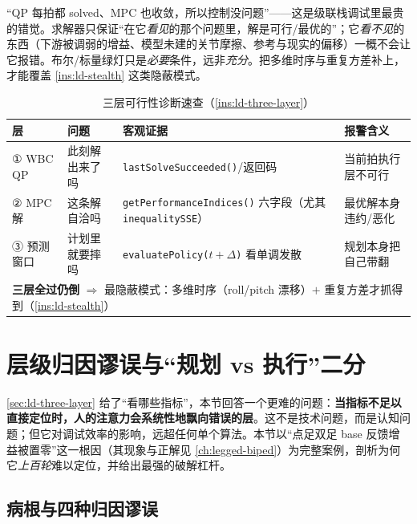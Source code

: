 \begin{pitfall}
“QP 每拍都 solved、MPC 也收敛，所以控制没问题”——这是级联栈调试里最贵的错觉。求解器只保证“在它\emph{看见}的那个问题里，解是可行/最优的”；它\emph{看不见}的东西（下游被调弱的增益、模型未建的关节摩擦、参考与现实的偏移）一概不会让它报错。布尔/标量绿灯只是\emph{必要}条件，远非\emph{充分}。把多维时序与重复方差补上，才能覆盖 \cref{ins:ld-stealth} 这类隐蔽模式。
\end{pitfall}

\begin{table}[H]\centering\small
\caption{三层可行性诊断速查（\cref{ins:ld-three-layer}）}
\begin{tabular}{p{} p{} p{} p{}}
\toprule
层 & 问题 & 客观证据 & 报警含义 \\
\midrule
① WBC QP & 此刻解出来了吗 & \texttt{lastSolveSucceeded()}/返回码 & 当前拍执行层不可行 \\
② MPC 解 & 这条解自洽吗 & \texttt{getPerformanceIndices()} 六字段（尤其 \texttt{inequalitySSE}）& 最优解本身违约/恶化 \\
③ 预测窗口 & 计划里就要摔吗 & \texttt{evaluatePolicy($t{+}\Delta$)} 看单调发散 & 规划本身把自己带翻 \\
\midrule
\multicolumn{4}{l}{\textbf{三层全过仍倒} $\Rightarrow$ 最隐蔽模式：多维时序（roll/pitch 漂移）$+$ 重复方差才抓得到（\cref{ins:ld-stealth}）}\\
\bottomrule
\end{tabular}
\label{tab:ld-three-layer}
\end{table}

\section{层级归因谬误与“规划 vs 执行”二分}
\label{sec:ld-attribution}

\cref{sec:ld-three-layer} 给了“看哪些指标”，本节回答一个更难的问题：\textbf{当指标不足以直接定位时，人的注意力会系统性地飘向错误的层}。这不是技术问题，而是认知问题；但它对调试效率的影响，远超任何单个算法。本节以“点足双足 base 反馈增益被置零”这一根因（其现象与正解见 \cref{ch:legged-biped}）为完整案例，剖析为何它\emph{上百轮}难以定位，并给出最强的破解杠杆。

\subsection{病根与四种归因谬误}
\label{subsec:ld-fallacy}

